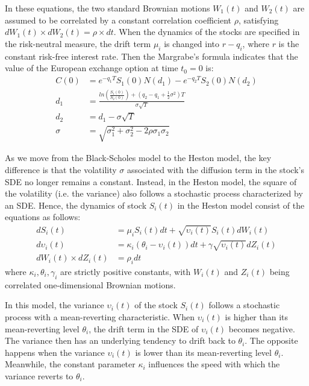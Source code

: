 \documentclass{article}
\begin{document}
	In these equations, the two standard Brownian motions $W_1(t)$ and $W_2(t)$ are assumed to be correlated by a constant correlation coefficient $\rho$, satisfying $dW_1(t) \times dW_2(t) = \rho \times dt$. When the dynamics of the stocks are specified in the risk-neutral measure, the drift term $\mu_i$ is changed into $r-q_i$, where $r$ is the constant risk-free interest rate. Then the Margrabe's formula indicates that the value of the European exchange option at time $t_0=0$ is:
	\begin{align*}
	C(0) &= e^{-q_1 T} S_1(0) N(d_1) - e^{-q_2 T} S_2(0) N(d_2) \\
	d_1 &= \frac{ln(\frac{S_1(0)}{S_2(0)}) + (q_2 - q_1 + \frac{1}{2} \sigma^2) T}{\sigma \sqrt{T}} \\
	d_2 &= d_1 - \sigma \sqrt{T} \\
	\sigma &= \sqrt{\sigma_1^2 + \sigma_2^2 - 2 \rho \sigma_1 \sigma_2}
	\end{align*}	
	
	As we move from the Black-Scholes model to the Heston model, the key difference is that the volatility $\sigma$ associated with the diffusion term in the stock's SDE no longer remains a constant. Instead, in the Heston model, the square of the volatility (i.e. the variance) also follows a stochastic process characterized by an SDE. Hence, the dynamics of stock $S_i(t)$ in the Heston model consist of the equations as follows:
	\begin{align*}
	dS_i(t) &= \mu_i S_i(t) dt + \sqrt{\upsilon_i(t)} S_i(t) dW_i(t) \\
	d\upsilon_i(t) &= \kappa_i (\theta_i - \upsilon_i(t)) dt + \gamma \sqrt{\upsilon_i(t)} dZ_i(t) \\
	dW_i(t) \times dZ_i(t) &= \rho_i dt
	\end{align*}
	where $\kappa_i, \theta_i, \gamma_i$ are strictly positive constants, with $W_i(t)$ and $Z_i(t)$ being correlated one-dimensional Brownian motions.
    
	In this model, the variance $\upsilon_i(t)$ of the stock $S_i(t)$ follows a stochastic process with a mean-reverting characteristic. When $\upsilon_i(t)$ is higher than its mean-reverting level $\theta_i$, the drift term in the SDE of $\upsilon_i(t)$ becomes negative. The variance then has an underlying tendency to drift back to $\theta_i$. The opposite happens when the variance $\upsilon_i(t)$ is lower than its mean-reverting level $\theta_i$. Meanwhile, the constant parameter $\kappa_i$ influences the speed with which the variance reverts to $\theta_i$. 
	
\end{document}
